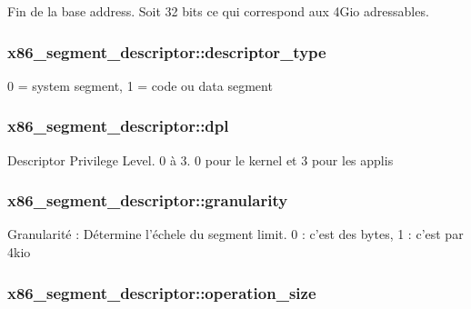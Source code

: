 Fin de la base address. Soit 32 bits ce qui correspond aux 4\-Gio adressables. \hypertarget{structx86__segment__descriptor_adda0434239b7e6c6a68b8e7556e4bb2f}{
\subsubsection[{descriptor\-\_\-type}]{ x86\-\_\-segment\-\_\-descriptor\-::descriptor\-\_\-type}}\label{structx86__segment__descriptor_adda0434239b7e6c6a68b8e7556e4bb2f}
0 = system segment, 1 = code ou data segment \hypertarget{structx86__segment__descriptor_ab45e49c27bbe57a568d914bd13e45ef7}{
\subsubsection[{dpl}]{ x86\-\_\-segment\-\_\-descriptor\-::dpl}}\label{structx86__segment__descriptor_ab45e49c27bbe57a568d914bd13e45ef7}
Descriptor Privilege Level. 0 à 3. 0 pour le kernel et 3 pour les applis \hypertarget{structx86__segment__descriptor_a19d5da93d41a1ec3327cbd92ace8fa08}{
\subsubsection[{granularity}]{ x86\-\_\-segment\-\_\-descriptor\-::granularity}}\label{structx86__segment__descriptor_a19d5da93d41a1ec3327cbd92ace8fa08}
Granularité \-: Détermine l'échele du segment limit. 0 \-: c'est des bytes, 1 \-: c'est par 4kio \hypertarget{structx86__segment__descriptor_a40c320788bf23e3660d0def872cec94c}{
\subsubsection[{operation\-\_\-size}]{ x86\-\_\-segment\-\_\-descriptor\-::operation\-\_\-size}}\label{structx86__segment__descriptor_a40c320788bf23e3660d0def872cec94c}
